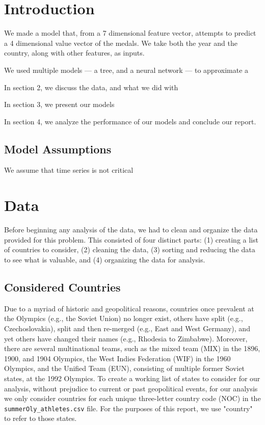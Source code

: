 \documentclass[12pt]{article}
\begin{document}
\section{Introduction}

We made a model that, from a 7 dimensional feature vector, attempts to predict a 4 dimensional value vector of the medals.
We take both the year and the country, along with other features, as inputs.

We used multiple models — a tree, and a neural network — to approximate a 

In section 2, we discuss the data, and what we did with 

In section 3, we present our models

In section 4, we analyze the performance of our models and conclude our report.


\subsection{Model Assumptions}
We assume that time series is not critical 

\section{Data}

Before beginning any analysis of the data, we had to clean and organize the data provided for this problem. 
This consisted of four distinct parts: (1) creating a list of countries to consider, (2) cleaning the data, (3) sorting and reducing the data to see what is valuable, and (4) organizing the data for analysis.

\subsection{Considered Countries}
Due to a myriad of historic and geopolitical reasons, countries once prevalent at the Olympics (e.g., the Soviet Union) no longer exist, others have split (e.g., Czechoslovakia), split and then re-merged (e.g., East and West Germany), and yet others have changed their names (e.g., Rhodesia to Zimbabwe). 
Moreover, there are several multinational teams, such as the mixed team (MIX) in the 1896, 1900, and 1904 Olympics, the West Indies Federation (WIF) in the 1960 Olympics, and the Unified Team (EUN), consisting of multiple former Soviet states, at the 1992 Olympics. 
To create a working list of states to consider for our analysis, without prejudice to current or past geopolitical events, for our analysis we only consider countries for each unique three-letter country code (NOC) in the \verb|summerOly_athletes.csv| file.
For the purposes of this report, we use "country" to refer to those states. 
\end{document}
